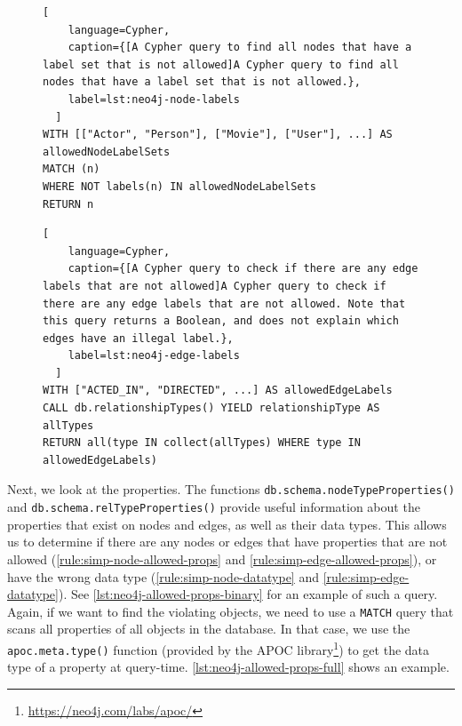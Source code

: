 \documentclass{report}
\theoremstyle{definition}
\begin{document}
\begin{figure}[H]
  \begin{lstlisting}[
    language=Cypher,
    caption={[A Cypher query to find all nodes that have a label set that is not allowed]A Cypher query to find all nodes that have a label set that is not allowed.},
    label=lst:neo4j-node-labels
  ]
WITH [["Actor", "Person"], ["Movie"], ["User"], ...] AS allowedNodeLabelSets
MATCH (n)
WHERE NOT labels(n) IN allowedNodeLabelSets
RETURN n
  \end{lstlisting}
\end{figure}
\vspace*{-8pt}
\begin{figure}[H]
  \begin{lstlisting}[
    language=Cypher,
    caption={[A Cypher query to check if there are any edge labels that are not allowed]A Cypher query to check if there are any edge labels that are not allowed. Note that this query returns a Boolean, and does not explain which edges have an illegal label.},
    label=lst:neo4j-edge-labels
  ]
WITH ["ACTED_IN", "DIRECTED", ...] AS allowedEdgeLabels
CALL db.relationshipTypes() YIELD relationshipType AS allTypes
RETURN all(type IN collect(allTypes) WHERE type IN allowedEdgeLabels)
  \end{lstlisting}
\end{figure}

Next, we look at the properties. The functions \texttt{db.schema.nodeTypeProperties()} and \texttt{db.schema.relTypeProperties()} provide useful information about the properties that exist on nodes and edges, as well as their data types. This allows us to determine if there are any nodes or edges that have properties that are not allowed (\autoref{rule:simp-node-allowed-props} and \ref{rule:simp-edge-allowed-props}), or have the wrong data type (\autoref{rule:simp-node-datatype} and \ref{rule:simp-edge-datatype}). See \autoref{lst:neo4j-allowed-props-binary} for an example of such a query. Again, if we want to find the violating objects, we need to use a \texttt{MATCH} query that scans all properties of all objects in the database. In that case, we use the \texttt{apoc.meta.type()} function (provided by the APOC library\footnote{\url{https://neo4j.com/labs/apoc/}}) to get the data type of a property at query-time. \autoref{lst:neo4j-allowed-props-full} shows an example.
\end{document}
